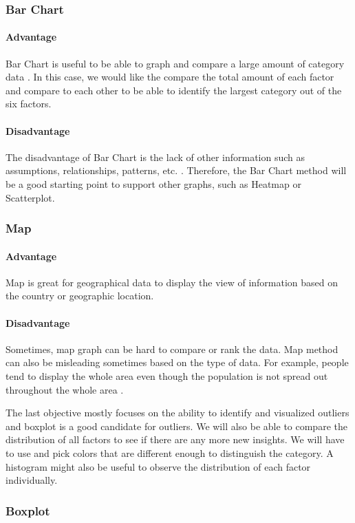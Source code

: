 \documentclass[11pt,twocolumn]{article}
\begin{document}
\subsubsection{Bar Chart} 
\paragraph{Advantage} Bar Chart is useful to be able to graph and compare a large amount of category data \cite{bar-chart}. In this case, we would like the compare the total amount of each factor and compare to each other to be able to identify the largest category out of the six factors.

\paragraph{Disadvantage} The disadvantage of Bar Chart is the lack of other information such as assumptions, relationships, patterns, etc. \cite{bar-chart}. Therefore, the Bar Chart method will be a good starting point to support other graphs, such as Heatmap or Scatterplot.

\subsubsection{Map} 
\paragraph{Advantage} Map is great for geographical data to display the view of information based on the country or geographic location.
\paragraph{Disadvantage} Sometimes, map graph can be hard to compare or rank the data. Map method can also be misleading sometimes based on the type of data. For example, people tend to display the whole area even though the population is not spread out throughout the whole area \cite{map}. 

The last objective mostly focuses on the ability to identify and visualized outliers and boxplot is a good candidate for outliers. We will also be able to compare the distribution of all factors to see if there are any more new insights. We will have to use and pick colors that are different enough to distinguish the category. A histogram might also be useful to observe the distribution of each factor individually. 

\subsubsection{Boxplot} 
\end{document}
